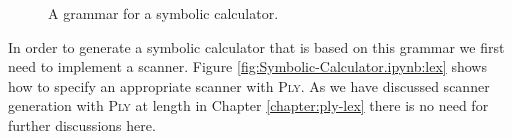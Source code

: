 \begin{figure}[!ht]

  \begin{center}    
  \end{center}
  \caption{A grammar for a symbolic calculator.}
  \label{fig:calculator.g}
\end{figure}

In order to generate a symbolic calculator that is based on this grammar we first need to implement a scanner.
Figure \ref{fig:Symbolic-Calculator.ipynb:lex} shows how to specify an appropriate scanner with \textsc{Ply}.
As we have discussed scanner generation with \textsc{Ply} at length in Chapter \ref{chapter:ply-lex} there is
no need for further discussions here.

